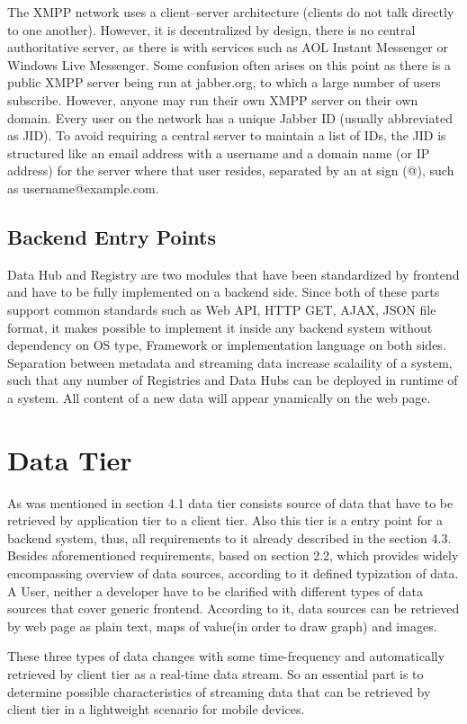       The XMPP network uses a client–server architecture (clients do not talk directly to one another). However, it is decentralized by design, there is no central authoritative server, as there is with services such as AOL Instant Messenger or Windows Live Messenger. Some confusion often arises on this point as there is a public XMPP server being run at jabber.org, to which a large number of users subscribe. However, anyone may run their own XMPP server on their own domain. Every user on the network has a unique Jabber ID (usually abbreviated as JID). To avoid requiring a central server to maintain a list of IDs, the JID is structured like an email address with a username and a domain name (or IP address) for the server where that user resides, separated by an at sign (@), such as username@example.com.  

\subsection{Backend Entry Points}
    Data Hub and Registry are two modules that have been standardized by frontend and have to be fully implemented on a backend side. Since both of these parts support common standards such as Web API, HTTP GET, AJAX, JSON file format, it makes possible to implement it inside any backend system without dependency on OS type, Framework or implementation language on both sides. Separation between metadata and streaming data increase scalaility of a system, such that any number of Registries and Data Hubs can be deployed in runtime of a system. All content of a new data will appear ynamically on the web page.    

\section{Data Tier}
   As was mentioned in section 4.1 data tier consists source of data that have to be retrieved by application tier to a client tier. Also this tier is a entry point for a backend system, thus, all requirements to it already described in the section 4.3. Besides aforementioned requirements, based on section 2.2, which provides widely encompassing overview of data sources, according to it defined typization of data. A User, neither a developer have to be clarified with different types of data sources that cover generic frontend. According to it, data sources can be retrieved by web page as plain text, maps of value(in order to draw graph) and images.

   These three types of data changes with some time-frequency and automatically retrieved by client tier as a real-time data stream. So an essential part is to determine possible characteristics of streaming data that can be retrieved by client tier in a lightweight scenario for mobile devices.

